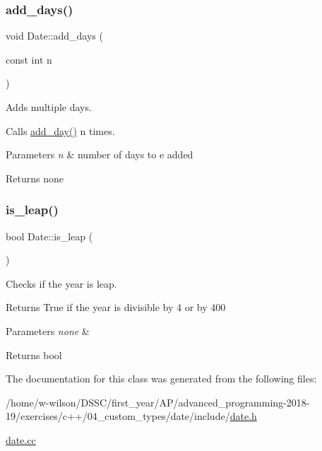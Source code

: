 \subsubsection{\texorpdfstring{add\+\_\+days()}{add\_days()}}
{\footnotesize\ttfamily void Date\+::add\+\_\+days (\begin{DoxyParamCaption}\item[{const int}]{n }\end{DoxyParamCaption})}



Adds multiple days. 

Calls \hyperlink{class_date_a1060f2334b942a33f16e76471225d0db}{add\+\_\+day()} n times. 
\begin{DoxyParams}{Parameters}
{\em n} & number of days to e added \\
\hline
\end{DoxyParams}
\begin{DoxyReturn}{Returns}
none 
\end{DoxyReturn}
\mbox{\label{class_date_af12996155259f3fb64206bf250d50e10}} 
\subsubsection{\texorpdfstring{is\+\_\+leap()}{is\_leap()}}
{\footnotesize\ttfamily bool Date\+::is\+\_\+leap (\begin{DoxyParamCaption}{ }\end{DoxyParamCaption})}



Checks if the year is leap. 

Returns True if the year is divisible by 4 or by 400 
\begin{DoxyParams}{Parameters}
{\em none} & \\
\hline
\end{DoxyParams}
\begin{DoxyReturn}{Returns}
bool 
\end{DoxyReturn}


The documentation for this class was generated from the following files\+:\begin{DoxyCompactItemize}
\item 
/home/w-\/wilson/\+D\+S\+S\+C/first\+\_\+year/\+A\+P/advanced\+\_\+programming-\/2018-\/19/exercises/c++/04\+\_\+custom\+\_\+types/date/include/\hyperlink{date_8h}{date.\+h}\item 
\hyperlink{date_8cc}{date.\+cc}\end{DoxyCompactItemize}
